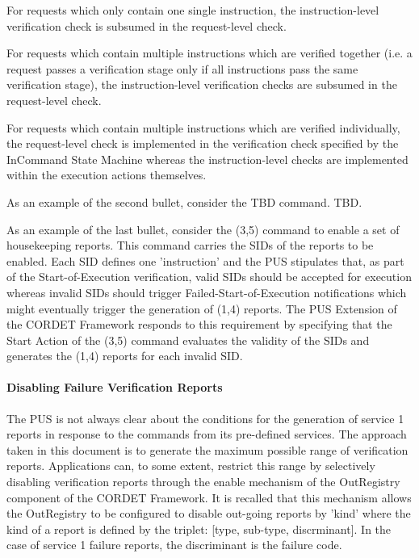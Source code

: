 \documentclass[a4paper,10pt]{article}
\newenvironment{fw_itemize}						%
{\begin{itemize}
  \setlength{\itemsep}{1mm}
  \setlength{\parskip}{0pt}
  \setlength{\parsep}{0pt}}
{\end{itemize}}
\begin{document}
\begin{fw_itemize}
\item For requests which only contain one single instruction, the instruction-level verification check is subsumed in the request-level check.
\item For requests which contain multiple instructions which are verified together (i.e. a request passes a verification stage only if all instructions pass the same verification stage), the instruction-level verification checks are subsumed in the request-level check.
\item For requests which contain multiple instructions which are verified individually, the request-level check is implemented in the verification check specified by the InCommand State Machine whereas the instruction-level checks are implemented within the execution actions themselves.
\end{fw_itemize}

As an example of the second bullet, consider the TBD command. TBD.

As an example of the last bullet, consider the (3,5) command to enable a set of housekeeping reports. This command carries the SIDs of the reports to be enabled. Each SID defines one 'instruction' and the PUS stipulates that, as part of the Start-of-Execution verification, valid SIDs should be accepted for execution whereas invalid SIDs should trigger Failed-Start-of-Execution notifications which might eventually trigger the generation of (1,4) reports. The PUS Extension of the CORDET Framework responds to this requirement by specifying that the Start Action of the (3,5) command evaluates the validity of the SIDs and generates the (1,4) reports for each invalid SID.
 
\paragraph{Disabling Failure Verification Reports} 
The PUS is not always clear about the conditions for the generation of service 1 reports in response to the commands from its pre-defined services. The approach taken in this document is to generate the maximum possible range of verification reports. Applications can, to some extent, restrict this range by selectively disabling verification reports through the enable mechanism of the OutRegistry component of the CORDET Framework. It is recalled that this mechanism allows the OutRegistry to be configured to disable out-going reports by 'kind' where the kind of a report is defined by the triplet: [type, sub-type, discrminant]. In the case of service 1 failure reports, the discriminant is the failure code. 
 
\end{document}
